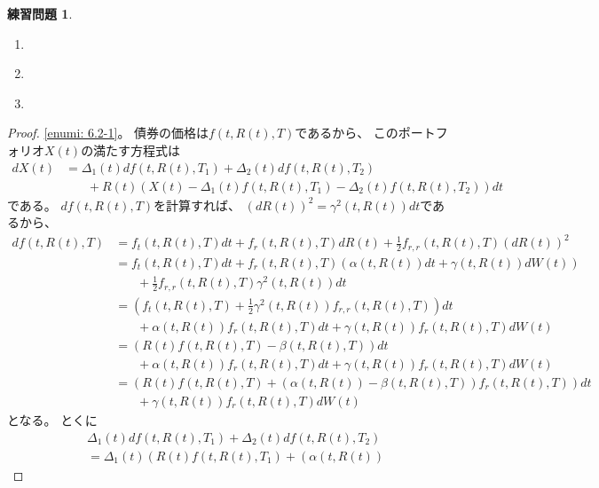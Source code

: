 \documentclass[uplatex]{jsarticle}
\theoremstyle{definition}
\newtheorem{prob}[prob]{練習問題}
\begin{document}
\begin{prob}\label{prob: 6.2}
  \begin{enumerate}
    \item \label{enumi: 6.2-1}
    \item \label{enumi: 6.2-2}
    \item \label{enumi: 6.2-3}
  \end{enumerate}
\end{prob}

\begin{proof}
  \ref{enumi: 6.2-1}。
  債券の価格は\(f(t,R(t),T)\)であるから、
  このポートフォリオ\(X(t)\)の満たす方程式は
  \begin{align*}
    dX(t)
    &= \Delta_1(t)df(t,R(t),T_1)
    + \Delta_2(t)df(t,R(t),T_2) \\
    &\ \ \ \ \ \ \ \
    + R(t)\left( X(t) - \Delta_1(t)f(t,R(t),T_1)
    - \Delta_2(t)f(t,R(t),T_2) \right)dt
  \end{align*}
  である。
  \(df(t,R(t),T)\)を計算すれば、
  \(\left( dR(t) \right)^2 = \gamma^2(t,R(t))dt\)であるから、
  \begin{align*}
    df(t,R(t),T)
    &= f_t(t,R(t),T)dt + f_r(t,R(t),T)dR(t)
    + \frac{1}{2}f_{r,r}(t,R(t),T)\left( dR(t)\right)^2 \\
    &= f_t(t,R(t),T)dt
    + f_r(t,R(t),T)\left( \alpha(t,R(t))dt + \gamma(t,R(t))dW(t)\right) \\
    &\ \ \ \ \ \ \ \
    + \frac{1}{2}f_{r,r}(t,R(t),T)\gamma^2(t,R(t))dt \\
    &= \left( f_t(t,R(t),T)
    + \frac{1}{2}\gamma^2(t,R(t))f_{r,r}(t,R(t),T) \right)dt \\
    &\ \ \ \ \ \ \ \
    + \alpha(t,R(t))f_r(t,R(t),T)dt
    + \gamma(t,R(t))f_r(t,R(t),T)dW(t) \\
    &= \left( R(t)f(t,R(t),T) - \beta(t,R(t),T) \right)dt \\
    &\ \ \ \ \ \ \ \
    + \alpha(t,R(t))f_r(t,R(t),T)dt
    + \gamma(t,R(t))f_r(t,R(t),T)dW(t) \\
    &= \left( R(t)f(t,R(t),T)
    + \left( \alpha(t,R(t))
    - \beta(t,R(t),T)\right)f_r(t,R(t),T) \right)dt \\
    &\ \ \ \ \ \ \ \
    + \gamma(t,R(t))f_r(t,R(t),T)dW(t)
  \end{align*}
  となる。
  とくに
  \begin{align*}
    &\Delta_1(t)df(t,R(t),T_1) + \Delta_2(t)df(t,R(t),T_2) \\
    &= \Delta_1(t)\left( R(t)f(t,R(t),T_1)
    + \left( \alpha(t,R(t))

\end{align*}
\end{proof}
\end{document}
